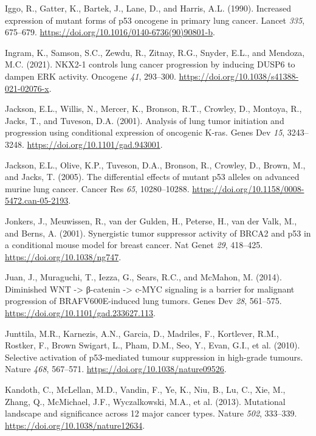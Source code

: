 \begin{CSLReferences}{0}{0}
\leavevmode{}%
Iggo, R., Gatter, K., Bartek, J., Lane, D., and Harris, A.L. (1990). Increased expression of mutant forms of p53 oncogene in primary lung cancer. Lancet \emph{335}, 675--679. \url{https://doi.org/10.1016/0140-6736(90)90801-b}.

\leavevmode{}%
Ingram, K., Samson, S.C., Zewdu, R., Zitnay, R.G., Snyder, E.L., and Mendoza, M.C. (2021). NKX2-1 controls lung cancer progression by inducing DUSP6 to dampen ERK activity. Oncogene \emph{41}, 293--300. \url{https://doi.org/10.1038/s41388-021-02076-x}.

\leavevmode{}%
Jackson, E.L., Willis, N., Mercer, K., Bronson, R.T., Crowley, D., Montoya, R., Jacks, T., and Tuveson, D.A. (2001). Analysis of lung tumor initiation and progression using conditional expression of oncogenic K-ras. Genes Dev \emph{15}, 3243--3248. \url{https://doi.org/10.1101/gad.943001}.

\leavevmode{}%
Jackson, E.L., Olive, K.P., Tuveson, D.A., Bronson, R., Crowley, D., Brown, M., and Jacks, T. (2005). The differential effects of mutant p53 alleles on advanced murine lung cancer. Cancer Res \emph{65}, 10280--10288. \url{https://doi.org/10.1158/0008-5472.can-05-2193}.

\leavevmode{}%
Jonkers, J., Meuwissen, R., van der Gulden, H., Peterse, H., van der Valk, M., and Berns, A. (2001). Synergistic tumor suppressor activity of BRCA2 and p53 in a conditional mouse model for breast cancer. Nat Genet \emph{29}, 418--425. \url{https://doi.org/10.1038/ng747}.

\leavevmode{}%
Juan, J., Muraguchi, T., Iezza, G., Sears, R.C., and McMahon, M. (2014). Diminished WNT -\textgreater{} β-catenin -\textgreater{} c-MYC signaling is a barrier for malignant progression of BRAFV600E-induced lung tumors. Genes Dev \emph{28}, 561--575. \url{https://doi.org/10.1101/gad.233627.113}.

\leavevmode{}%
Junttila, M.R., Karnezis, A.N., Garcia, D., Madriles, F., Kortlever, R.M., Rostker, F., Brown Swigart, L., Pham, D.M., Seo, Y., Evan, G.I., et al. (2010). Selective activation of p53-mediated tumour suppression in high-grade tumours. Nature \emph{468}, 567--571. \url{https://doi.org/10.1038/nature09526}.

\leavevmode{}%
Kandoth, C., McLellan, M.D., Vandin, F., Ye, K., Niu, B., Lu, C., Xie, M., Zhang, Q., McMichael, J.F., Wyczalkowski, M.A., et al. (2013). Mutational landscape and significance across 12 major cancer types. Nature \emph{502}, 333--339. \url{https://doi.org/10.1038/nature12634}.


\end{CSLReferences}
